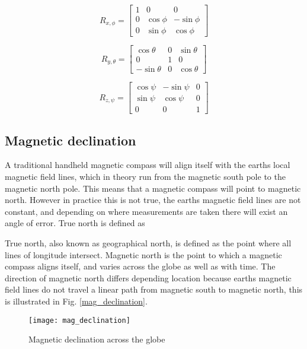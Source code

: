 \begin{equation}
    R_{x,\phi} = \begin{bmatrix} 1 & 0 & 0 \\ 0 & \cos\phi & -\sin\phi \\ 0 & \sin\phi & \cos\phi \end{bmatrix}
    \label{eq:R_x}
\end{equation}

\begin{equation}
    R_{y,\theta} = \begin{bmatrix} \cos\theta & 0 & \sin\theta \\ 0 & 1 & 0 \\ -\sin\theta & 0 & \cos\theta \end{bmatrix}
    \label{eq:R_y}
\end{equation}

\begin{equation}
    R_{z,\psi} = \begin{bmatrix} \cos\psi & -\sin\psi & 0 \\ \sin\psi & \cos\psi & 0 \\ 0 & 0 & 1 \end{bmatrix}
    \label{eq:R_z}
\end{equation}

\subsection{Magnetic declination}

A traditional handheld magnetic compass will align itself with the earths local magnetic field lines, which in theory run from the magnetic south pole to the magnetic north pole. This 
means that a magnetic compass will point to magnetic north. However in practice this is not true, the earths magnetic field lines are not constant, and depending on where measurements
are taken there will exist an angle of error. True north is defined as  

True north, also known as geographical north, is defined as the point where all lines of longitude intersect. Magnetic north is the point to which a magnetic compass aligns itself, and 
varies across the globe as well as with time. The direction of magnetic north differs depending location because earths magnetic field lines do not travel a linear path from magnetic 
south to magnetic north, this is illustrated in Fig. \ref{mag_declination}. 

\begin{figure}[!h]
    \centering
    \texttt{[image: mag\_declination]}
    \caption[Magnetic declination across the globe]{Magnetic declination across the globe \cite{Mag_declination}}
    \label{fig:mag_declination}
\end{figure}


